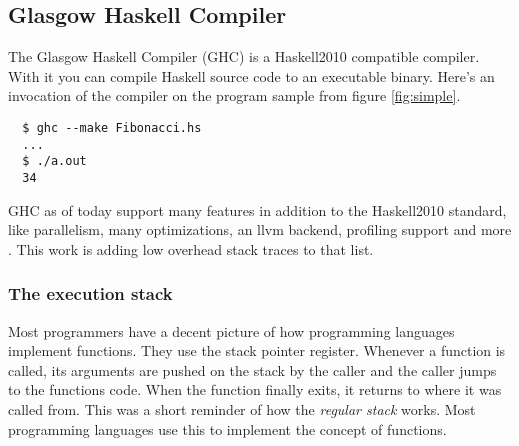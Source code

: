 

\subsection{Glasgow Haskell Compiler}

The Glasgow Haskell Compiler (GHC) is a Haskell2010 compatible compiler.
\cite{ghc_website} With it you can compile Haskell source code to an executable
binary. Here's an invocation of the compiler on the program sample from figure \ref{fig:simple}.

\begin{verbatim}
  $ ghc --make Fibonacci.hs
  ...
  $ ./a.out
  34
\end{verbatim}

GHC as of today support many features in addition to the Haskell2010
standard, like parallelism, many optimizations, an llvm backend, profiling
support and more \cite{ghc_website}. This
work is adding low overhead stack traces to that list.

\subsubsection{The execution stack}

Most programmers have a decent picture of how programming languages implement
functions. They use the stack pointer register. Whenever a function is called, its
arguments are pushed on the stack by the caller and the caller jumps to the
functions code. When the function finally exits, it returns to where it was
called from. This was a short reminder of how the \emph{regular stack} works.
Most programming languages use this to implement the concept of functions.

